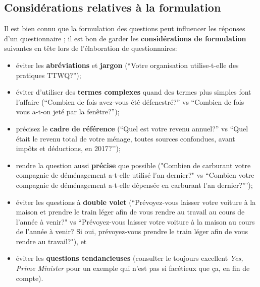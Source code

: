 \subsection{Considérations relatives à la formulation} Il est bien connu que la formulation des questions peut influencer les réponses d'un questionnaire \cite{DC_G}; il est bon de garder les \textbf{considérations de formulation} suivantes en tête lors de l'élaboration de questionnaires:   
\begin{itemize}[noitemsep] 
\item éviter les \textbf{abréviations} et \textbf{jargon} (``Votre organisation utilise-t-elle des pratiques TTWQ?'');
\item éviter d'utiliser des \textbf{termes complexes} quand des termes plus simples font l'affaire (``Combien de fois avez-vous été défenestré?'' vs ``Combien de fois vous a-t-on jeté par la fenêtre?'');
\item précisez le \textbf{cadre de référence} (``Quel est votre revenu annuel?'' vs ``Quel était le revenu total de votre ménage, toutes sources confondues, avant impôts et déductions, en 2017?’’);
\item rendre la question aussi \textbf{précise} que possible ("Combien de carburant votre compagnie de déménagement a-t-elle utilisé l'an dernier?" vs ``Combien votre compagnie de déménagement a-t-elle dépensée en carburant l’an dernier?''');
\item éviter les questions à \textbf{double volet} (``Prévoyez-vous laisser votre voiture à la maison et prendre le train léger afin de vous rendre au travail au cours de l'année à venir?" vs ``Prévoyez-vous laisser votre voiture à la maison au cours de l'année à venir? Si oui, prévoyez-vous prendre le train léger afin de vous rendre au travail?"), et 
\item éviter les \textbf{questions tendancieuses} (consulter le toujours excellent \textit{Yes, Prime Minister} \cite{DC_YPM} pour un exemple qui n’est pas si facétieux que ça, en fin de compte).
\end{itemize}
